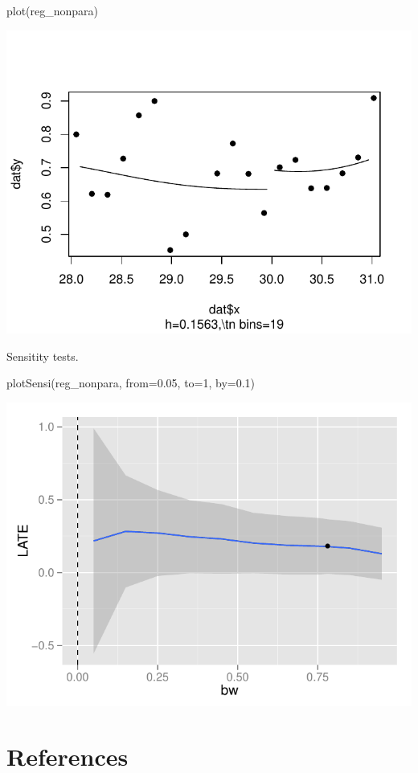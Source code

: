 \documentclass[article]{jss}
\begin{document}
\begin{CodeChunk}
\begin{CodeInput}
plot(reg_nonpara)
\end{CodeInput}


\begin{center}\includegraphics{README_files/figure-latex/unnamed-chunk-11-1} \end{center}

\end{CodeChunk}

Sensitity tests.

\begin{CodeChunk}
\begin{CodeInput}
plotSensi(reg_nonpara, from=0.05, to=1, by=0.1)
\end{CodeInput}


\begin{center}\includegraphics{README_files/figure-latex/unnamed-chunk-12-1} \end{center}

\end{CodeChunk}

\section{References}\label{references}
\end{document}
